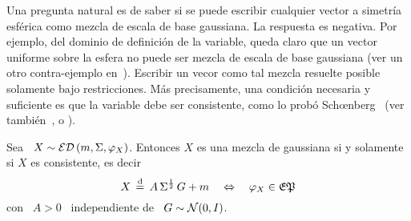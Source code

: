 Una  pregunta natural  es  de saber  si  se puede  escribir  cualquier vector  a
simetr\'ia esf\'erica como mezcla de  escala de base gaussiana.  La respuesta es
negativa. Por ejemplo,  del dominio de definici\'on de  la variable, queda claro
que un  vector uniforme sobre la  esfera no puede  ser mezcla de escala  de base
gaussiana (ver un otro  contra-ejemplo en~\cite{Pic70}).  Escribir un vecor como
tal mezcla  resuelte posible solamente bajo  restricciones.  M\'as precisamente,
una condici\'on necesaria y suficiente  es que la variable debe ser consistente,
como       lo        prob\'o       Sch{\oe}nberg~\cite[Teo.~2]{Sch38}       (ver
tambi\'en~\cite[Teo.~2]{SteVan05},            \cite[Lem.~2.2]{Yao73}           o
\cite[Teo.~1]{Kan94}).
%
\begin{teorema}
\label{Teo:MP:SchoenbergCaracteristica}
%
Sea \ $X  \sim \mathcal{ED}\left( m ,  \Sigma , \varphi_X \right)$.  Entonces  $X$ es una
mezcla de gaussiana si y solamente si $X$ es consistente, es decir
  \[
  X \,  \stackrel{\mathrm{d}}{=} \,  A \, \Sigma^{\frac12}  \, G  + m \quad  \Leftrightarrow \quad
  \varphi_X \in \mathfrak{EP}
  \]
  con \ $A > 0$ \ independiente de \ $G \sim \mathcal{N}(0,I)$.
\end{teorema}
%
